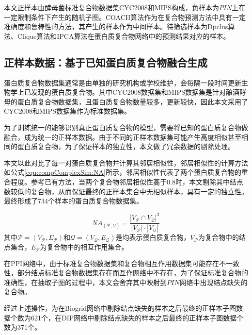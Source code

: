 本文正样本由酵母菌标准复合物数据集CYC2008\cite{pu_up--date_2009}和MIPS\cite{pagel_mips_2005}构成，负样本为$PIN$上在一定限制条件下产生的随机子图。COACH算法\cite{leung_predicting_2009}作为在复合物预测方法中具有一定准确度和鲁棒性的方法，其产生的样本作为中间样本。待筛选样本为Dpclus算法、Clique算法和IPCA算法在蛋白质复合物网络中的预测结果对应的样本。


\subsection{正样本数据：基于已知蛋白质复合物融合生成}
\label{subsection:allSample:positiveSampleData}

蛋白质复合物数据集通常是由单独的研究机构或学校维护，会每隔一段时间更新生物学上已发现的蛋白质复合物。其中CYC2008数据集和MIPS数据集是针对酿酒酵母的蛋白质复合物数据集，且蛋白质复合物数量较多，更新较快，因此本文采用了CYC2008和MIPS数据集作为标准数据集。

为了训练统一的能够识别真正蛋白质复合物的模型，需要将已知的蛋白质复合物做融合，成为统一的正样本数据。由于不同的正样本数据集可能产生高度相似甚至相同的蛋白质复合物，为了保证样本的独立性，本文做了冗余数据的剔除处理。

本文以此对比了每一对蛋白质复合物并计算其邻居相似性，邻居相似性的计算方法如公式\ref{equ:compComplexSim:NA}所示，邻居相似性代表了两个蛋白质复合物的重合程度。参考已有方法，当两个复合物邻居相似性高于0.8时，本文剔除其中结点数较低的复合物，从而保证最终的正样本集合中无相似样本，具有一定的独立性。最终形成了734个样本的蛋白质复合物数据集。

\begin{equation}
    \label{equ:compComplexSim:NA}
    NA_{(\mathcal{P} ,\mathcal{Q} )} = \frac{{\left\lvert V_{\mathcal{P}} \cap V_{\mathcal{Q}}\right\rvert}^2 }{{\left\lvert V_{\mathcal{P}} \right\rvert}\cdot  {\left\lvert V_{\mathcal{Q}} \right\rvert}}
\end{equation}
其中$\mathcal{P}=(V_{\mathcal{P}} ,E_{\mathcal{P}})$和$\mathcal{Q}=(V_{\mathcal{Q}} ,E_{\mathcal{Q}})$是均表示蛋白质复合物，$V_{\mathcal{P}}$为复合物中的结点集合，$E_{\mathcal{P}}$为复合物中的相互作用集合。

在PPI网络中，由于标准复合物数据集和复合物相互作用数据集可能存在不一致性，部分结点标准复合物数据集存在而互作网络中不存在，为了保证标准复合物的准确性，在抽取子图的过程中，本文会舍弃其中映射到$PIN$网络中出现结点缺失的复合物。

经过上述操作，为在Biogrid网络中剔除结点缺失的样本之后最终的正样本子图数据个数为621个，在DIP网络中剔除结点缺失的样本之后最终的正样本子图数据个数为371个。

